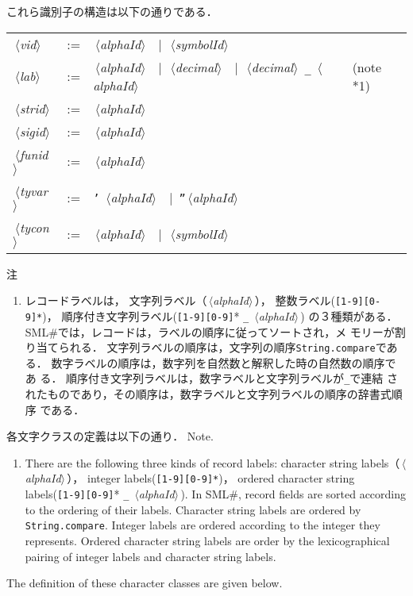 \documentclass{jbook}
\newcommand{\txt}[2]{#2}
\newcommand{\smlsharp}{SML\#}
\newcommand{\code}[1]{\mbox{\large\tt #1}}
\newcommand{\vbar}{\mbox{\ $|$\ }}
\newcommand{\nonterm}[1]{\mbox{$\,\langle$}{\it #1}\mbox{$\rangle\,$}}
\newcommand{\term}[1]{\mbox{{\tt #1}}}
\begin{document}
\begin{description}
	これら識別子の構造は以下の通りである．

\begin{center}
\begin{tabular}{lcll}
\nonterm{vid} &:=& \nonterm{alphaId} \vbar \nonterm{symbolId}
\\
\nonterm{lab} &:=& \nonterm{alphaId}
  \vbar \nonterm{decimal}
  \vbar \nonterm{decimal} \term{\_} \nonterm{alphaId}
                 & \txt{（注1）}{(note *1)}
\\
\nonterm{strid} &:=& \nonterm{alphaId} 
\\
\nonterm{sigid} &:=& \nonterm{alphaId} 
\\
\nonterm{funid} &:=& \nonterm{alphaId} 
\\
\nonterm{tyvar} &:=& \term{'} \nonterm{alphaId} \vbar \term{''}\nonterm{alphaId}
\\
\nonterm{tycon} &:=& \nonterm{alphaId} \vbar \nonterm{symbolId}
\end{tabular}
\end{center}%

\ifjp%
注
\begin{enumerate}
\item 
	レコードラベルは，
文字列ラベル（\nonterm{alphaId}），
整数ラベル(\term{[1-9][0-9]*})，
順序付き文字列ラベル(\term{[1-9][0-9]}* \code{\_} \nonterm{alphaId})
の３種類がある．
	\smlsharp{}では，レコードは，ラベルの順序に従ってソートされ，メ
モリーが割り当てられる．
	文字列ラベルの順序は，文字列の順序\code{String.compare}である．
	数字ラベルの順序は，数字列を自然数と解釈した時の自然数の順序であ
る．
	順序付き文字列ラベルは，数字ラベルと文字列ラベルが\verb|_|で連結
されたものであり，その順序は，数字ラベルと文字列ラベルの順序の辞書式順序
である．
\end{enumerate}
	各文字クラスの定義は以下の通り．
\else%
Note.
\begin{enumerate}
\item 
	There are the following three kinds of record labels:
character string labels（\nonterm{alphaId}），
integer labels(\term{[1-9][0-9]*})，
ordered character string labels(\term{[1-9][0-9]}* \code{\_} \nonterm{alphaId}).
	In \smlsharp{}, record fields are sorted according to the
ordering of their labels.
	Character string labels are ordered by \code{String.compare}.
	Integer labels are ordered according to the integer they represents.
	Ordered character string labels are order by the lexicographical
pairing of integer labels and character string labels.
\end{enumerate}
	The definition of these character classes are given below.
\fi%


\end{description}
\end{document}
